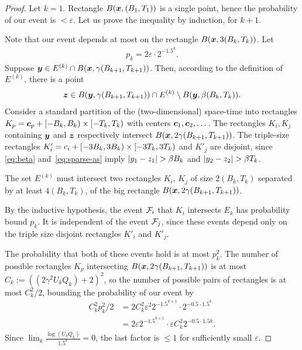 \documentclass[12pt]{memoir}
\renewcommand{\le}{\leq}
\def\B{B}
\def\U{U}
\newcommand{\Q}{Q}
\newcommand{\Tu}{T}
\begin{document}
\begin{proof}
Let \( k=1 \).
Rectangle \( B(\vek{x},(\B_{1}, \Tu_{1})) \) is a single point, hence
the probability of our event is \( <\varepsilon \).
Let us prove the inequality by induction, for \( k+1 \).

Note that our 
event depends at most on the rectangle \( B(\vek{x},3(\B_{k}, \Tu_{k})) \).
Let
\begin{align*}
   p_{k}=2\varepsilon\cdot 2^{-1.5^{k}}.
\end{align*}
Suppose \( \vek{y} \in E^{(k)}\cap B(\vek{x},\gamma(\B_{k+1}, \Tu_{k+1})  ) \).
Then, according to the definition of \( E^{(k)} \),  there is a point
\begin{align}\label{eq:sparse-as}
 \vek{z} \in
 B(\vek{y},\gamma(\B_{k+1},\Tu_{k+1}))\cap E^{(k)}\setminus B(\vek{y},\beta(\B_{k}, \Tu_{k})).
 \end{align}
Consider a standard partition of the (two-dimensional) space-time into
rectangles \( K_{p}=\vek{c}_{p}+\lint{-\B_{k}}{\B_{k}}\times \lint{-\Tu_{k}}{\Tu_{k}} \)
with centers \( \boldsymbol{c}_{1},\boldsymbol{c}_{2},\dots \).
The rectangles \( K_{i},K_{j} \) containing \( \boldsymbol{y} \) and \( \boldsymbol{z} \)
respectively intersect \( B(\vek{x}, 2\gamma(\B_{k+1}, \Tu_{k+1})) \).
The triple-size rectangles 
\( K'_{i}=c_{i} + \lint{-3\B_{k}}{3\B_{k}}\times \lint{-3\Tu_{k}}{3\Tu_{k}} \) and
\( K'_{j} \) are disjoint, since \eqref{eq:beta} and~\eqref{eq:sparse-as} imply
 \( \abs{y_{1} - z_{1}}>\beta\B_{k} \) and \( \abs{y_{2} - z_{2}}>\beta\Tu_{k} \).

The set \( E^{(k)} \) must intersect two rectangles \( K_{i} \),
\( K_{j} \) of size \( 2(\B_{k}, \Tu_{k}) \) separated by at least \( 4(\B_{k}, \Tu_{k}) \),
of the big rectangle \( B(\vek{x},2\gamma(\B_{k+1}, \Tu_{k+1})) \).

By the inductive hypothesis, the event \( \mathcal{F}_{i} \) that
\( K_{i} \) intersects \( E_{k} \) has probability bound \( p_{k} \).
It is independent of the event \( \mathcal{F}_{j} \), since these events depend
only on the triple size disjoint rectangles \( K'_{i} \) and \( K'_{j} \).

The probability that both of these events hold is at most \( p_{k}^{2} \).
The number of possible rectangles
\( K_{p} \) intersecting \( B(\vek{x},2\gamma(\B_{k+1}, \Tu_{k+1})) \) is
at most
\( C_{k}:=((2\gamma^{2}\U_{k} \Q_{k})+2)^{2} \), so the number of possible pairs of rectangles
is at most \( C_{k}^{2}/2 \), bounding the probability of our event by
 \begin{align*}
   C_{k}^{2}p_{k}^{2}/2
    &=
      2 C_{k}^{2}\varepsilon^{2} 2^{-1.5^{k+1}}\cdot 2^{-0.5\cdot 1.5^{k}}
   \\ &=2\varepsilon 2^{-1.5^{k+1}} \cdot \varepsilon
        C_{k}^{2}2^{-0.5\cdot 1.5{k}}.
 \end{align*}
Since \( \lim_{k}\frac{\log{(\U_{k} \Q_{k})}}{1.5^k}=0 \),
the last factor is \( \le 1 \) for sufficiently small  \( \varepsilon \).
\end{proof}
\end{document}
